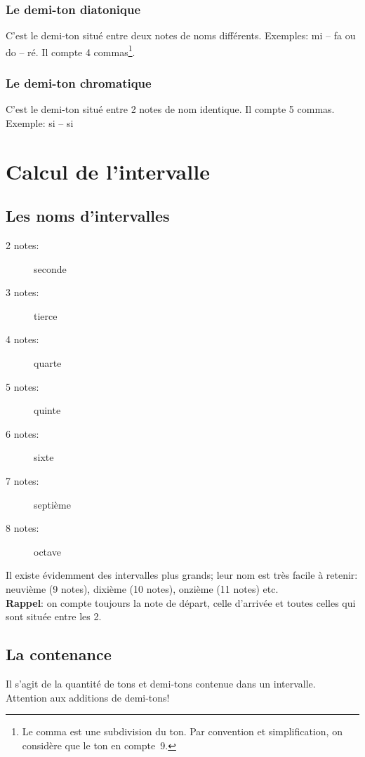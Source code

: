 \subsubsection{Le demi-ton diatonique}
C'est le demi-ton situé entre deux notes de noms différents. Exemples: mi -- fa ou do \sharp{} -- ré. Il compte 4 commas\footnote{Le comma est une subdivision du ton. Par convention et simplification, on considère que le ton en compte~9.}.
\subsubsection{Le demi-ton chromatique}
C'est le demi-ton situé entre 2 notes de nom identique. Il compte 5 commas. Exemple: si -- si \flat

\section{Calcul de l'intervalle}

\subsection{Les noms d'intervalles}
\begin{description}
\item [2 notes:] seconde
\item [3 notes:] tierce
\item [4 notes:] quarte
\item [5 notes:] quinte
\item [6 notes:] sixte
\item [7 notes:] septième
\item [8 notes:] octave
\end{description}
Il existe évidemment des intervalles plus grands; leur nom est très facile à retenir: neuvième (9 notes), dixième (10 notes), onzième (11 notes) etc.\\

\textbf{Rappel}: on compte toujours la note de départ, celle d'arrivée et toutes celles qui sont située entre les 2.
\subsection{La contenance}
Il s'agit de la quantité de tons et demi-tons contenue dans un intervalle. Attention aux additions de demi-tons!

